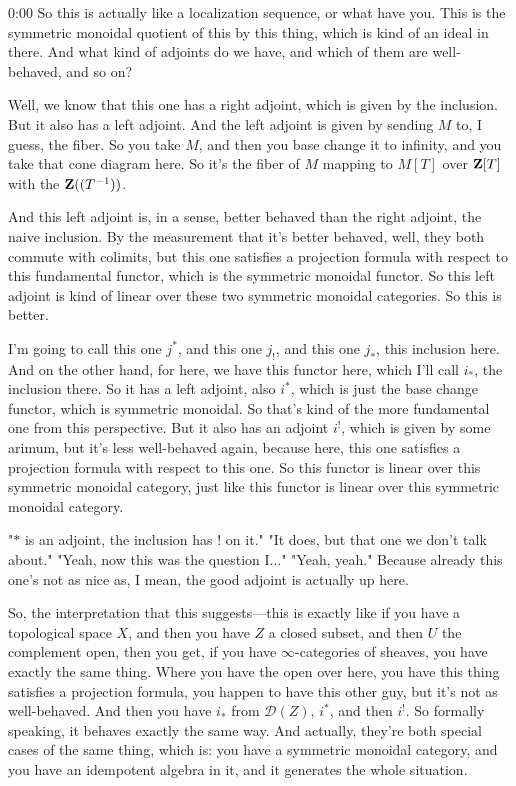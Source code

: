 \begin{unfinished}{0:00}
So this is actually like a localization sequence, or what have you. This is the symmetric monoidal quotient of this by this thing, which is kind of an ideal in there. And what kind of adjoints do we have, and which of them are well-behaved, and so on?

Well, we know that this one has a right adjoint, which is given by the inclusion. But it also has a left adjoint. And the left adjoint is given by sending $M$ to, I guess, the fiber. So you take $M$, and then you base change it to infinity, and you take that cone diagram here. So it's the fiber of $M$ mapping to $M[T]$ over $\mathbf Z[T]$ with the $\mathbf Z((T^{-1}))$.

And this left adjoint is, in a sense, better behaved than the right adjoint, the naive inclusion. By the measurement that it's better behaved, well, they both commute with colimits, but this one satisfies a projection formula with respect to this fundamental functor, which is the symmetric monoidal functor. So this left adjoint is kind of linear over these two symmetric monoidal categories. So this is better.

I'm going to call this one $j^*$, and this one $j_!$, and this one $j_*$, this inclusion here. And on the other hand, for here, we have this functor here, which I'll call $i_*$, the inclusion there. So it has a left adjoint, also $i^*$, which is just the base change functor, which is symmetric monoidal. So that's kind of the more fundamental one from this perspective. But it also has an adjoint $i^!$, which is given by some arimum, but it's less well-behaved again, because here, this one satisfies a projection formula with respect to this one. So this functor is linear over this symmetric monoidal category, just like this functor is linear over this symmetric monoidal category.

"$\ast$ is an adjoint, the inclusion has $!$ on it." 
"It does, but that one we don't talk about."
"Yeah, now this was the question I..."
"Yeah, yeah." Because already this one's not as nice as, I mean, the good adjoint is actually up here.

So, the interpretation that this suggests---this is exactly like if you have a topological space $X$, and then you have $Z$ a closed subset, and then $U$ the complement open, then you get, if you have $\infty$-categories of sheaves, you have exactly the same thing. Where you have the open over here, you have this thing satisfies a projection formula, you happen to have this other guy, but it's not as well-behaved. And then you have $i_*$ from $\mathcal{D}(Z)$, $i^*$, and then $i^!$. So formally speaking, it behaves exactly the same way. And actually, they're both special cases of the same thing, which is: you have a symmetric monoidal category, and you have an idempotent algebra in it, and it generates the whole situation.


\end{unfinished}
